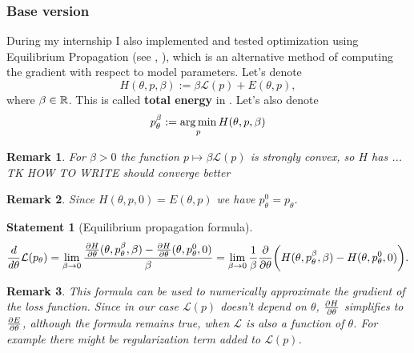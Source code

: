 \documentclass[a4paper,10pt]{report}
\newtheorem{statement}{Statement}
\newtheorem{remark}{Remark}
\begin{document}
\subsubsection{Base version}
During my internship I also implemented and tested optimization using Equilibrium Propagation (see \cite{eqprop}, \cite{zucchet2022beyond}), which is an alternative method of computing the gradient with respect to model parameters.
Let's denote
\begin{equation}
H(\theta, p, \beta) := \beta \mathcal{L}(p) + E(\theta, p),
\end{equation}
where $\beta \in \mathbb{R}$.
 This is called \textbf{total energy} in \cite{eqprop}. Let's also denote
\begin{equation}
p_{\theta}^{\beta}:=\operatorname*{arg\,min}_p H(\theta, p, \beta)
\end{equation}
\begin{remark}
 For $\beta>0$ the function $p \mapsto \beta \mathcal{L}(p)$ is strongly convex, so $H$ has ... TK HOW TO WRITE should converge better
 \end{remark}
 \begin{remark}
   Since $H(\theta,p,0) = E(\theta,p)$ we have $p_{\theta}^{0}=p_{\theta}$.
 \end{remark}







\begin{statement}[Equilibrium propagation formula]
 \begin{equation}
 \frac{d}{d\theta} \mathcal{L}(p_\theta) = \lim_{\beta \to 0} \frac{\frac{\partial H}{\partial \theta}(\theta, p_\theta^\beta, \beta)-\frac{\partial H}{\partial \theta}(\theta, p_\theta^0, 0) }{\beta} = \lim_{\beta \to 0}\frac{1}{\beta} \frac{\partial }{\partial \theta} \bigg(H(\theta, p_\theta^\beta,\beta) - H(\theta, p_\theta^0, 0)\bigg).
\end{equation}
\end{statement}
\begin{remark}

This formula can be used to numerically approximate the gradient of the loss function.
Since in our case $\mathcal{L}(p)$ doesn't depend on $\theta$, $\frac{\partial H}{\partial \theta}$ simplifies to $\frac{\partial E}{\partial \theta}$, although the formula remains true, when $\mathcal{L}$ is also a function of $\theta$. For example there might be regularization term added to $\mathcal{L}(p)$.
\end{remark}
\end{document}
